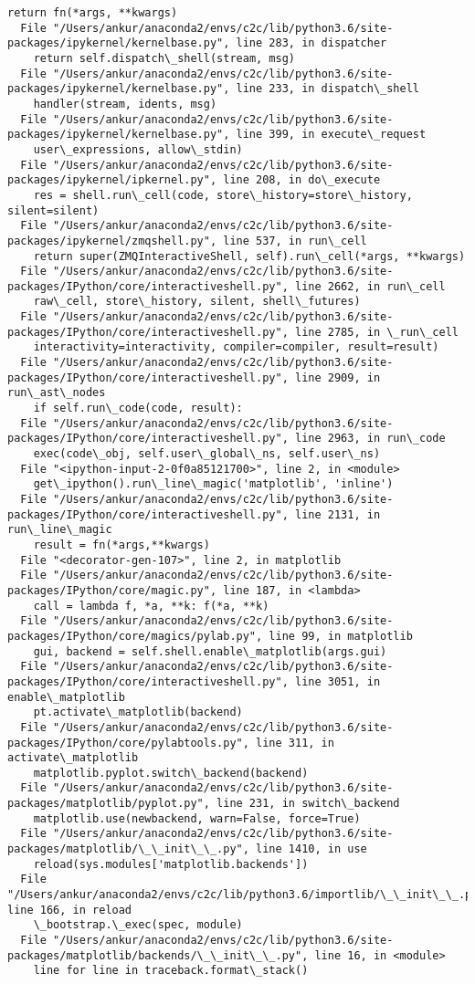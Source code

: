 \documentclass[11pt]{article}
\begin{document}
\begin{Verbatim}[commandchars=\\\{\}]
    return fn(*args, **kwargs)
  File "/Users/ankur/anaconda2/envs/c2c/lib/python3.6/site-packages/ipykernel/kernelbase.py", line 283, in dispatcher
    return self.dispatch\_shell(stream, msg)
  File "/Users/ankur/anaconda2/envs/c2c/lib/python3.6/site-packages/ipykernel/kernelbase.py", line 233, in dispatch\_shell
    handler(stream, idents, msg)
  File "/Users/ankur/anaconda2/envs/c2c/lib/python3.6/site-packages/ipykernel/kernelbase.py", line 399, in execute\_request
    user\_expressions, allow\_stdin)
  File "/Users/ankur/anaconda2/envs/c2c/lib/python3.6/site-packages/ipykernel/ipkernel.py", line 208, in do\_execute
    res = shell.run\_cell(code, store\_history=store\_history, silent=silent)
  File "/Users/ankur/anaconda2/envs/c2c/lib/python3.6/site-packages/ipykernel/zmqshell.py", line 537, in run\_cell
    return super(ZMQInteractiveShell, self).run\_cell(*args, **kwargs)
  File "/Users/ankur/anaconda2/envs/c2c/lib/python3.6/site-packages/IPython/core/interactiveshell.py", line 2662, in run\_cell
    raw\_cell, store\_history, silent, shell\_futures)
  File "/Users/ankur/anaconda2/envs/c2c/lib/python3.6/site-packages/IPython/core/interactiveshell.py", line 2785, in \_run\_cell
    interactivity=interactivity, compiler=compiler, result=result)
  File "/Users/ankur/anaconda2/envs/c2c/lib/python3.6/site-packages/IPython/core/interactiveshell.py", line 2909, in run\_ast\_nodes
    if self.run\_code(code, result):
  File "/Users/ankur/anaconda2/envs/c2c/lib/python3.6/site-packages/IPython/core/interactiveshell.py", line 2963, in run\_code
    exec(code\_obj, self.user\_global\_ns, self.user\_ns)
  File "<ipython-input-2-0f0a85121700>", line 2, in <module>
    get\_ipython().run\_line\_magic('matplotlib', 'inline')
  File "/Users/ankur/anaconda2/envs/c2c/lib/python3.6/site-packages/IPython/core/interactiveshell.py", line 2131, in run\_line\_magic
    result = fn(*args,**kwargs)
  File "<decorator-gen-107>", line 2, in matplotlib
  File "/Users/ankur/anaconda2/envs/c2c/lib/python3.6/site-packages/IPython/core/magic.py", line 187, in <lambda>
    call = lambda f, *a, **k: f(*a, **k)
  File "/Users/ankur/anaconda2/envs/c2c/lib/python3.6/site-packages/IPython/core/magics/pylab.py", line 99, in matplotlib
    gui, backend = self.shell.enable\_matplotlib(args.gui)
  File "/Users/ankur/anaconda2/envs/c2c/lib/python3.6/site-packages/IPython/core/interactiveshell.py", line 3051, in enable\_matplotlib
    pt.activate\_matplotlib(backend)
  File "/Users/ankur/anaconda2/envs/c2c/lib/python3.6/site-packages/IPython/core/pylabtools.py", line 311, in activate\_matplotlib
    matplotlib.pyplot.switch\_backend(backend)
  File "/Users/ankur/anaconda2/envs/c2c/lib/python3.6/site-packages/matplotlib/pyplot.py", line 231, in switch\_backend
    matplotlib.use(newbackend, warn=False, force=True)
  File "/Users/ankur/anaconda2/envs/c2c/lib/python3.6/site-packages/matplotlib/\_\_init\_\_.py", line 1410, in use
    reload(sys.modules['matplotlib.backends'])
  File "/Users/ankur/anaconda2/envs/c2c/lib/python3.6/importlib/\_\_init\_\_.py", line 166, in reload
    \_bootstrap.\_exec(spec, module)
  File "/Users/ankur/anaconda2/envs/c2c/lib/python3.6/site-packages/matplotlib/backends/\_\_init\_\_.py", line 16, in <module>
    line for line in traceback.format\_stack()



\end{Verbatim}
\end{document}
